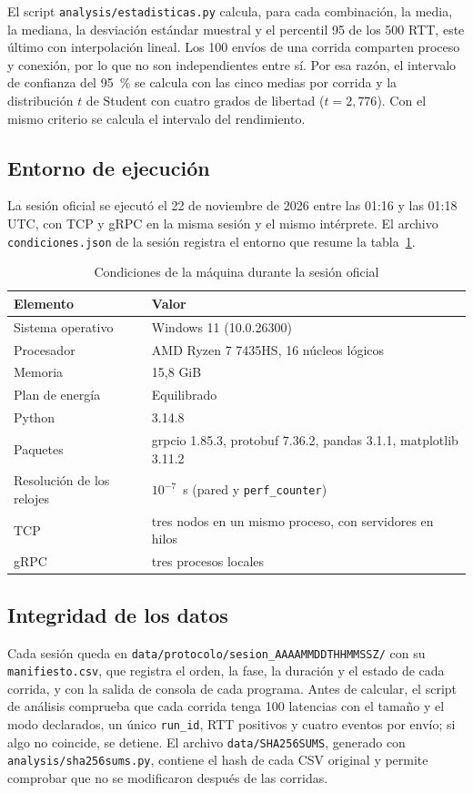 El script \texttt{analysis/estadisticas.py} calcula, para cada combinación, la media, la mediana, la desviación estándar muestral y el percentil 95 de los 500 RTT, este último con interpolación lineal. Los 100 envíos de una corrida comparten proceso y conexión, por lo que no son independientes entre sí. Por esa razón, el intervalo de confianza del 95~\% se calcula con las cinco medias por corrida y la distribución $t$ de Student con cuatro grados de libertad ($t = 2{,}776$). Con el mismo criterio se calcula el intervalo del rendimiento.

\subsection{Entorno de ejecución}

La sesión oficial se ejecutó el 22 de noviembre de 2026 entre las 01:16 y las 01:18 UTC, con TCP y gRPC en la misma sesión y el mismo intérprete. El archivo \texttt{condiciones.json} de la sesión registra el entorno que resume la tabla~\ref{tab:entorno}.

\begin{table}[htbp]
\centering
\small
\caption{Condiciones de la máquina durante la sesión oficial}
\label{tab:entorno}
\begin{tabular}{ll}
\hline
Elemento & Valor \\
\hline
Sistema operativo & Windows 11 (10.0.26300) \\
Procesador & AMD Ryzen 7 7435HS, 16 núcleos lógicos \\
Memoria & 15,8 GiB \\
Plan de energía & Equilibrado \\
Python & 3.14.8 \\
Paquetes & grpcio 1.85.3, protobuf 7.36.2, pandas 3.1.1, matplotlib 3.11.2 \\
Resolución de los relojes & $10^{-7}$~s (pared y \texttt{perf\_counter}) \\
TCP & tres nodos en un mismo proceso, con servidores en hilos \\
gRPC & tres procesos locales \\
\hline
\end{tabular}
\end{table}

\subsection{Integridad de los datos}

Cada sesión queda en \texttt{data/protocolo/sesion\_AAAAMMDDTHHMMSSZ/} con su \texttt{manifiesto.csv}, que registra el orden, la fase, la duración y el estado de cada corrida, y con la salida de consola de cada programa. Antes de calcular, el script de análisis comprueba que cada corrida tenga 100 latencias con el tamaño y el modo declarados, un único \texttt{run\_id}, RTT positivos y cuatro eventos por envío; si algo no coincide, se detiene. El archivo \texttt{data/SHA256SUMS}, generado con \texttt{analysis/sha256sums.py}, contiene el hash de cada CSV original y permite comprobar que no se modificaron después de las corridas.
